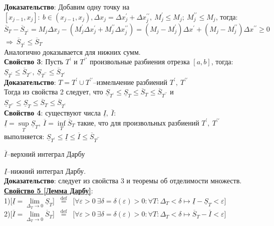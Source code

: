 \documentclass[a4paper,12pt]{article} %
\renewcommand {\geq}{\geqslant}
\renewcommand {\leq}{\leqslant}
\begin{document}
\textbf{Доказательство}: Добавим одну точку на $[x_{j-1},x_j]:~b\in (x_{j-1},x_j), \Delta x_j = \Delta x^{\prime}_j +\Delta x^{\prime\prime}_j,~M^{\prime}_j\leq M_j;~M^{\prime\prime}_j\leq M_j$, тогда:\\
$$\overline{S}_T-\overline{S}_{T^{\prime}}=M_j\Delta x_j-(M^{\prime}_j\Delta x^{\prime}_j+M^{\prime\prime}_j\Delta x^{\prime\prime}_j)=(M_j-M^{\prime}_j)\Delta x^{\prime}+(M_j-M^{\prime\prime}_j)\Delta x^{\prime\prime}\geq0$$
$\Rightarrow~\overline{S}_{T^{\prime}}\leq \overline{S}_T$\\
Аналогично доказывается для нижних сумм.\\

\textbf{Свойство 3}: Пусть $T^{\prime}$ и $T^{\prime\prime}$ произвольные разбиения отрезка $[a,b]$, тогда:
$\underline{S}_{T^{\prime}}\leq \overline{S}_{T^{\prime\prime}},~\underline{S}_{T^{\prime\prime}}\leq \overline{S}_{T^{\prime}}$\\

\textbf{Доказательство}: $T = T^{\prime}\cup T^{\prime\prime}$--измельчение разбиений $T^{\prime},~ T^{\prime\prime}$\\
Тогда из свойства 2 следует, что $\underline{S}_{T^{\prime}}\leq \underline{S}_T\leq \overline{S}_T\leq \overline{S}_{T^{\prime\prime}}$ и\\
$\underline{S}_{T^{\prime\prime}}\leq \underline{S}_T\leq \overline{S}_T\leq \overline{S}_{T^{\prime}}$\\


\textbf{Свойство 4}: существуют числа $\underline{I},~\overline{I}$:\\
$\underline{I}=\sup\limits_{T}{\underline{S}_T,~\overline{I}=\inf\limits_{T}{\overline{S}_T}}$ такие, что для произвольных разбиений $T^{\prime},~T^{\prime\prime}$ выполняется: 
$\underline{S}_{T^{\prime}}\leq \underline{I}\leq \overline{I}\leq \overline{S}_{T^{\prime\prime}}$

$\overline{I}$--верхний интеграл Дарбу

$\underline{I}$--нижний интеграл Дарбу.\\

\textbf{Доказательство}: следует из свойства 3 и теоремы об отделимости множеств.\\

\underline{\textbf{Свойство 5 [Лемма Дарбу]}}:\\
1)[$\underline{I}=\lim\limits_{\Delta_T\rightarrow 0}{\underline{S}_T}$] $\stackrel{\text { def }}{=}$ [$\forall\varepsilon>0~\exists\delta = \delta(\varepsilon)>0: \forall T:\Delta_{T}<\delta \longmapsto \underline{I}-\underline{S}_T<\varepsilon$]\\
2)[$\overline{I}=\lim\limits_{\Delta_T\rightarrow 0}{\overline{S}_T}$] $\stackrel{\text { def }}{=}$ [$\forall\varepsilon>0~\exists\delta = \delta(\varepsilon)>0: \forall T:\Delta_{T}<\delta \longmapsto \overline{S}_T-\overline{I}<\varepsilon$]\\
\end{document}
